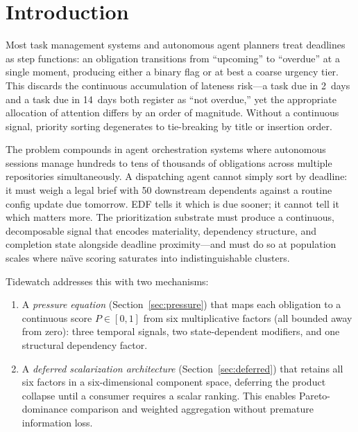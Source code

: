 \documentclass[11pt]{article}
\begin{document}
\section{Introduction}
\label{sec:intro}

Most task management systems and autonomous agent planners treat
deadlines as step functions: an obligation transitions from
``upcoming'' to ``overdue'' at a single moment, producing either a
binary flag or at best a coarse urgency tier.  This discards the
continuous accumulation of lateness risk---a task due in 2~days
and a task due in 14~days both register as ``not overdue,'' yet the
appropriate allocation of attention differs by an order of magnitude.
Without a continuous signal, priority sorting degenerates to
tie-breaking by title or insertion order.

The problem compounds in agent orchestration systems where autonomous
sessions manage hundreds to tens of thousands of obligations across
multiple repositories simultaneously.  A dispatching agent cannot
simply sort by deadline: it must weigh a legal brief with 50
downstream dependents against a routine config update due tomorrow.
EDF tells it which is due sooner; it cannot tell it which matters
more.  The prioritization substrate must produce a continuous,
decomposable signal that encodes materiality, dependency structure,
and completion state alongside deadline proximity---and must do so
at population scales where na\"{\i}ve scoring saturates into
indistinguishable clusters.

Tidewatch addresses this with two mechanisms:
\begin{enumerate}[nosep]
  \item A \emph{pressure equation} (Section~\ref{sec:pressure}) that
        maps each obligation to a continuous score $P \in [0, 1]$ from
        six multiplicative factors (all bounded away from zero):
        three temporal signals, two state-dependent modifiers, and one
        structural dependency factor.
  \item A \emph{deferred scalarization architecture}
        (Section~\ref{sec:deferred}) that retains all six factors
        in a six-dimensional component space, deferring the product
        collapse until a consumer requires a scalar ranking.  This
        enables Pareto-dominance comparison and weighted aggregation
        without premature information loss.
\end{enumerate}
\end{document}
